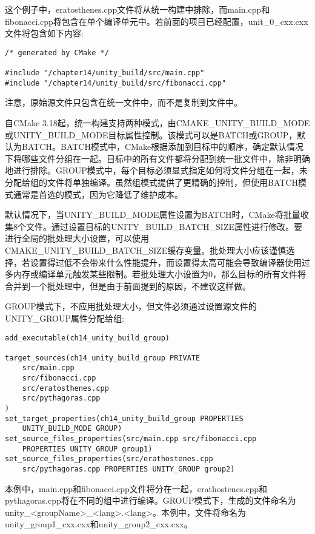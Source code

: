 这个例子中，eratosthenes.cpp文件将从统一构建中排除，而main.cpp和fibonacci.cpp将包含在单个编译单元中。若前面的项目已经配置，unit\_0\_cxx.cxx文件将包含如下内容:

\begin{lstlisting}[style=styleCXX]
/* generated by CMake */

#include "/chapter14/unity_build/src/main.cpp"
#include "/chapter14/unity_build/src/fibonacci.cpp"
\end{lstlisting}

注意，原始源文件只包含在统一文件中，而不是复制到文件中。

自CMake 3.18起，统一构建支持两种模式，由CMAKE\_UNITY\_BUILD\_MODE或UNITY\_BUILD\_MODE目标属性控制。该模式可以是BATCH或GROUP，默认为BATCH。BATCH模式中，CMake根据添加到目标中的顺序，确定默认情况下将哪些文件分组在一起。目标中的所有文件都将分配到统一批文件中，除非明确地进行排除。GROUP模式中，每个目标必须显式指定如何将文件分组在一起，未分配给组的文件将单独编译。虽然组模式提供了更精确的控制，但使用BATCH模式通常是首选的模式，因为它降低了维护成本。

默认情况下，当UNITY\_BUILD\_MODE属性设置为BATCH时，CMake将批量收集8个文件。通过设置目标的UNITY\_BUILD\_BATCH\_SIZE属性进行修改。要进行全局的批处理大小设置，可以使用CMAKE\_UNITY\_BUILD\_BATCH\_SIZE缓存变量。批处理大小应该谨慎选择，若设置得过低不会带来什么性能提升，而设置得太高可能会导致编译器使用过多内存或编译单元触发某些限制。若批处理大小设置为0，那么目标的所有文件将合并到一个批处理中，但是由于前面提到的原因，不建议这样做。

GROUP模式下，不应用批处理大小，但文件必须通过设置源文件的UNITY\_GROUP属性分配给组:

\begin{lstlisting}[style=styleCMake]
add_executable(ch14_unity_build_group)

target_sources(ch14_unity_build_group PRIVATE
	src/main.cpp
	src/fibonacci.cpp
	src/eratosthenes.cpp
	src/pythagoras.cpp
)
set_target_properties(ch14_unity_build_group PROPERTIES
	UNITY_BUILD_MODE GROUP)
set_source_files_properties(src/main.cpp src/fibonacci.cpp
	PROPERTIES UNITY_GROUP group1)
set_source_files_properties(src/erathostenes.cpp
	src/pythagoras.cpp PROPERTIES UNITY_GROUP group2)
\end{lstlisting}

本例中，main.cpp和fibonacci.cpp文件将分在一起，erathostenes.cpp和pythagoras.cpp将在不同的组中进行编译。GROUP模式下，生成的文件命名为unity\_<groupName>\_<lang>.<lang>。本例中，文件将命名为unity\_group1\_cxx.cxx和unity\_group2\_cxx.cxx。

